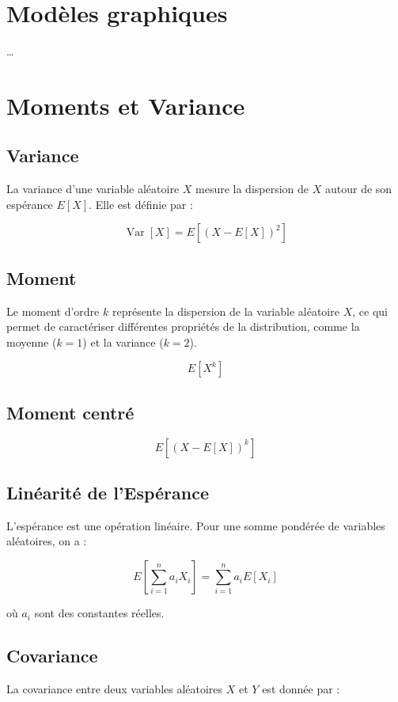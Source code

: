 \documentclass{article}
\begin{document}
\section{Modèles graphiques}
\dots

\section{Moments et Variance}

\subsection{Variance}

La variance d'une variable aléatoire $X$ mesure la dispersion de $X$ autour de son espérance $E[X]$. Elle est définie par :

\[
\operatorname{Var}[X] = E\left[ (X - E[X])^2 \right]
\]

\subsection{Moment}

Le moment d'ordre $k$ représente la dispersion de la variable aléatoire $X$, ce qui permet de caractériser différentes propriétés de la distribution, comme la moyenne ($k = 1$) et la variance ($k=2$).

\[
E[X^k]
\]

\subsection{Moment centré}

\[
E[(X-E[X])^k]
\]
\subsection{Linéarité de l'Espérance}

L'espérance est une opération linéaire. Pour une somme pondérée de variables aléatoires, on a :

\[
E\left[ \sum_{i=1}^n a_i X_i \right] = \sum_{i=1}^n a_i E[X_i]
\]

où $a_i$ sont des constantes réelles.

\subsection{Covariance}

La covariance entre deux variables aléatoires $X$ et $Y$ est donnée par :
\end{document}
